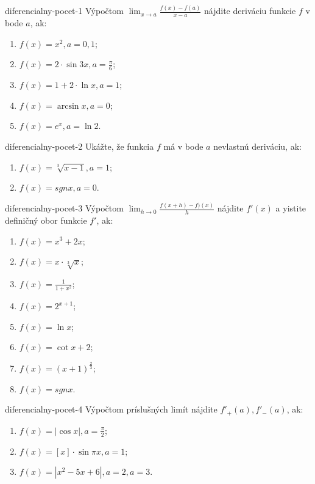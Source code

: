 \begin{defproblem}{diferencialny-pocet-1}
Výpočtom $\lim_{x \rightarrow a}\frac{f(x)-f(a)}{x-a}$ nájdite deriváciu funkcie $f$ v bode $a$, ak:
\begin{multicols}{2}
\begin{enumerate}
    \item $f(x)=x^2,a=0,1$;
    \item $f(x)=2\cdot \sin 3x,a=\frac{\pi}{6}$;
    \item $f(x)=1+2\cdot \ln x,a=1$;
    \item $f(x)=\arcsin x,a=0$;
    \item $f(x)=e^x,a=\ln 2$.
\end{enumerate}
\end{multicols}
\end{defproblem}

\begin{defproblem}{diferencialny-pocet-2}
Ukážte, že funkcia $f$ má v bode $a$ nevlastnú deriváciu, ak:
\begin{enumerate}
\item $f(x)=\sqrt[3]{x-1},a=1$;
\item $f(x)=sgn x,a=0$.
\end{enumerate}
\end{defproblem}

\begin{defproblem}{diferencialny-pocet-3}
Výpočtom $\lim_{h \rightarrow 0}\frac{f(x+h)-f)(x)}{h}$ nájdite $f'(x)$ a yistite definičný obor funkcie $f'$, ak:
\begin{multicols}{2}
\begin{enumerate}
   \item $f(x)=x^3+2x$;
   \item $f(x)=x\cdot \sqrt[3]{x}$;
   \item $f(x)=\frac{1}{1+x^2}$;
   \item $f(x)=2^{x+1}$;
   \item $f(x)=\ln x$;
   \item $f(x)=\cot x+2$;
   \item $f(x)=(x+1)^{\frac{2}{3}}$;
   \item $f(x)=sgn x$.
\end{enumerate}
\end{multicols}
\end{defproblem}

\begin{defproblem}{diferencialny-pocet-4}
Výpočtom príslušných limít nájdite $f'_+(a),f'_-(a)$, ak:
\begin{enumerate}
\item $f(x)=|\cos x|,a=\frac{\pi}{2}$;
\item $f(x)=[x]\cdot \sin \pi x,a=1$;
\item $f(x)=|x^2-5x+6|,a=2,a=3$.
\end{enumerate}
\end{defproblem}

